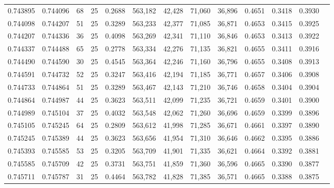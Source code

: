 \begin{tabular}{rrrrrrrrrrrrr}
0.743895 & 0.744096 &    68 &  25 &                                     0.2688 & 563,182 &  42,428 &  71,060 &  36,896 & 0.4651 & 0.3418 & 0.3930 \\
0.744098 & 0.744207 &    51 &  25 &                                     0.3289 & 563,233 &  42,377 &  71,085 &  36,871 & 0.4653 & 0.3415 & 0.3925 \\
0.744207 & 0.744336 &    36 &  25 &                                     0.4098 & 563,269 &  42,341 &  71,110 &  36,846 & 0.4653 & 0.3413 & 0.3922 \\
0.744337 & 0.744488 &    65 &  25 &                                     0.2778 & 563,334 &  42,276 &  71,135 &  36,821 & 0.4655 & 0.3411 & 0.3916 \\
0.744490 & 0.744590 &    30 &  25 &                                     0.4545 & 563,364 &  42,246 &  71,160 &  36,796 & 0.4655 & 0.3408 & 0.3913 \\
0.744591 & 0.744732 &    52 &  25 &                                     0.3247 & 563,416 &  42,194 &  71,185 &  36,771 & 0.4657 & 0.3406 & 0.3908 \\
0.744733 & 0.744864 &    51 &  25 &                                     0.3289 & 563,467 &  42,143 &  71,210 &  36,746 & 0.4658 & 0.3404 & 0.3904 \\
0.744864 & 0.744987 &    44 &  25 &                                     0.3623 & 563,511 &  42,099 &  71,235 &  36,721 & 0.4659 & 0.3401 & 0.3900 \\
0.744989 & 0.745104 &    37 &  25 &                                     0.4032 & 563,548 &  42,062 &  71,260 &  36,696 & 0.4659 & 0.3399 & 0.3896 \\
0.745105 & 0.745245 &    64 &  25 &                                     0.2809 & 563,612 &  41,998 &  71,285 &  36,671 & 0.4661 & 0.3397 & 0.3890 \\
0.745245 & 0.745389 &    44 &  25 &                                     0.3623 & 563,656 &  41,954 &  71,310 &  36,646 & 0.4662 & 0.3395 & 0.3886 \\
0.745393 & 0.745585 &    53 &  25 &                                     0.3205 & 563,709 &  41,901 &  71,335 &  36,621 & 0.4664 & 0.3392 & 0.3881 \\
0.745585 & 0.745709 &    42 &  25 &                                     0.3731 & 563,751 &  41,859 &  71,360 &  36,596 & 0.4665 & 0.3390 & 0.3877 \\
0.745711 & 0.745787 &    31 &  25 &                                     0.4464 & 563,782 &  41,828 &  71,385 &  36,571 & 0.4665 & 0.3388 & 0.3875 \\

\end{tabular}
